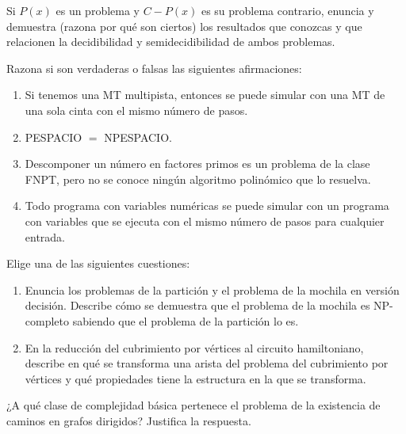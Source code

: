 \documentclass[12pt]{article}
\begin{document}
    \begin{ejercicio}[1.3 puntos]
        Si $P(x)$ es un problema y $C-P(x)$ es su problema contrario, enuncia y demuestra (razona por qué son ciertos) los resultados que conozcas y que relacionen la decidibilidad y semidecidibilidad de ambos problemas.
    \end{ejercicio}

    \begin{ejercicio}[2.4 puntos]
        Razona si son verdaderas o falsas las siguientes afirmaciones:
        \begin{enumerate}
            \item Si tenemos una MT multipista, entonces se puede simular con una MT de una sola cinta con el mismo número de pasos.
            
            \item PESPACIO $=$ NPESPACIO.
            
            \item Descomponer un número en factores primos es un problema de la clase FNPT, pero no se conoce ningún algoritmo polinómico que lo resuelva.
            
            \item Todo programa con variables numéricas se puede simular con un programa con variables que se ejecuta con el mismo número de pasos para cualquier entrada.
        \end{enumerate}
    \end{ejercicio}

    \begin{ejercicio}[1.3 puntos]
        Elige una de las siguientes cuestiones:
        \begin{enumerate}
            \item Enuncia los problemas de la partición y el problema de la mochila en versión decisión. Describe cómo se demuestra que el problema de la mochila es NP-completo sabiendo que el problema de la partición lo es.
            
            \item En la reducción del cubrimiento por vértices al circuito hamiltoniano, describe en qué se transforma una arista del problema del cubrimiento por vértices y qué propiedades tiene la estructura en la que se transforma.
        \end{enumerate}
    \end{ejercicio}

    \begin{ejercicio}[1.3 puntos]
        ¿A qué clase de complejidad básica pertenece el problema de la existencia de caminos en grafos dirigidos? Justifica la respuesta.
    \end{ejercicio}
\end{document}
